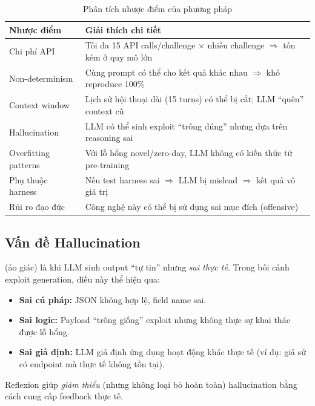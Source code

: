 \documentclass{nt521report}
\begin{document}
\begin{table}[H]
  \centering
  \caption{Phân tích nhược điểm của phương pháp}
  \label{tab:disadvantages}
  \begin{tabularx}{\textwidth}{l X}
    \toprule
    \textbf{Nhược điểm} & \textbf{Giải thích chi tiết} \\
    \midrule
    Chi phí API & Tối đa 15 API calls/challenge × nhiều challenge $\Rightarrow$ tốn kém ở quy mô lớn \\
    Non-determinism & Cùng prompt có thể cho kết quả khác nhau $\Rightarrow$ khó reproduce 100\% \\
    Context window & Lịch sử hội thoại dài (15 turns) có thể bị cắt; LLM ``quên'' context cũ \\
    Hallucination & LLM có thể sinh exploit ``trông đúng'' nhưng dựa trên reasoning sai \\
    Overfitting patterns & Với lỗ hổng novel/zero-day, LLM không có kiến thức từ pre-training \\
    Phụ thuộc harness & Nếu test harness sai $\Rightarrow$ LLM bị mislead $\Rightarrow$ kết quả vô giá trị \\
    Rủi ro đạo đức & Công nghệ này có thể bị sử dụng sai mục đích (offensive) \\
    \bottomrule
  \end{tabularx}
\end{table}

\subsection{Vấn đề Hallucination}

 (ảo giác) là khi LLM sinh output ``tự tin'' nhưng \textit{sai thực tế}. Trong bối cảnh exploit generation, điều này thể hiện qua:

\begin{itemize}
  \item \textbf{Sai cú pháp:} JSON không hợp lệ, field name sai.
  \item \textbf{Sai logic:} Payload ``trông giống'' exploit nhưng không thực sự khai thác được lỗ hổng.
  \item \textbf{Sai giả định:} LLM giả định ứng dụng hoạt động khác thực tế (ví dụ: giả sử có endpoint mà thực tế không tồn tại).
\end{itemize}

Reflexion giúp \textit{giảm thiểu} (nhưng không loại bỏ hoàn toàn) hallucination bằng cách cung cấp feedback thực tế.
\end{document}
